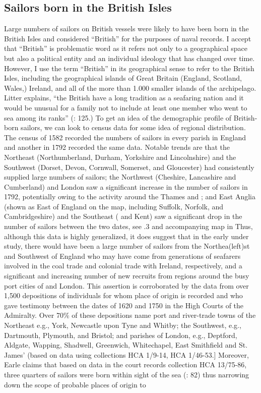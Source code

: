 \subsection{{Sailors born in the British Isles} }\label{sec:3.9.2}


Large numbers of sailors on British vessels were likely to have been born in the British Isles and considered “British” for the purposes of naval records. I accept that “British” is problematic word as it refers not only to a geographical space but also a political entity and an individual ideology that has changed over time. However, I use the term “British” in its geographical sense to refer to the British Isles, including the geographical islands of Great Britain (England, Scotland, Wales,) Ireland, and all of the more than 1.000 smaller islands of the archipelago. Litter explains, “the British have a long tradition as a seafaring nation and it would be unusual for a family not to include at least one member who went to sea among its ranks” (\citeyear*{Litter1999}: 125.) To get an idea of the demographic profile of British-born sailors, we can look to census data for some idea of regional distribution. The census of 1582 recorded the numbers of sailors in every parish in England \citep[246]{Bicheno2012} and another in 1792 recorded the same data. Notable trends are that the Northeast (Northumberland, Durham, Yorkshire and Lincolnshire) and the Southwest (Dorset, Devon, Cornwall, Somerset, and Gloucester) had consistently supplied large numbers of sailors; the Northwest (Cheshire, Lancashire and Cumberland) and London saw a significant increase in the number of sailors in 1792, potentially owing to the activity around the Thames and ; and East Anglia (shown as East of England on the map, including Suffolk, Norfolk, and Cambridgeshire) and the Southeast ( and Kent) saw a significant drop in the number of sailors between the two dates, see .3 and accompanying map in  Thus, although this data is highly generalized, it does suggest that in the early  under study, there would have been a large number of sailors from the Northea(left)st and Southwest of England who may have come from generations of seafarers involved in the coal trade and colonial trade with Ireland, respectively, and a significant and increasing number of new recruits from regions around the busy port cities of  and London. This assertion is corroborated by the data from over 1,500 depositions of individuals for whom place of origin is recorded and who gave testimony between the dates of 1620 and 1750 in the High Courts of the Admiralty. Over 70\% of these depositions name port and river-trade towns of the Northeast e.g., York, Newcastle upon Tyne and Whitby; the Southwest, e.g., Dartmouth, Plymouth, and Bristol; and parishes of London, e.g., Deptford, Aldgate, Wapping, Shadwell, Greenwich, Whitechapel, East Smithfield and St. James’ (based on  data using collections HCA 1/9-14, HCA 1/46-53.] Moreover, Earle claims that based on data in the court records collection HCA 13/75-86, three quarters of sailors were born within sight of the sea (\citeyear*{Earle1993}: 82) thus narrowing down the scope of probable places of origin to 
